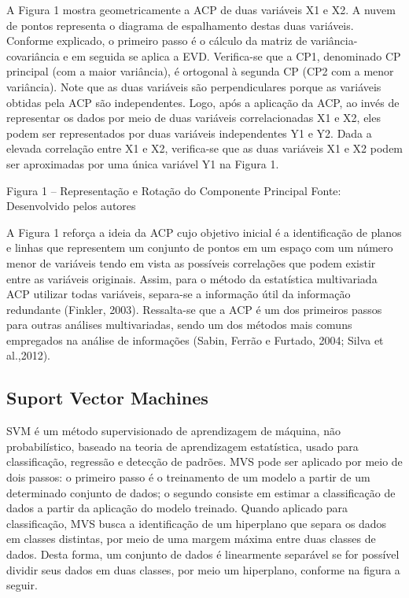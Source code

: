 A Figura 1 mostra geometricamente a ACP de duas variáveis X1 e X2. A nuvem de pontos representa o diagrama de espalhamento destas duas variáveis. Conforme explicado, o primeiro passo é o cálculo da matriz de variância-covariância e em seguida se aplica a EVD. Verifica-se que a CP1, denominado CP principal (com a maior variância), é ortogonal à segunda CP (CP2 com a menor variância). Note que as duas variáveis são perpendiculares porque as variáveis obtidas pela ACP são independentes. Logo, após a aplicação da ACP, ao invés de representar os dados por meio de duas variáveis correlacionadas X1 e X2, eles podem ser representados por duas variáveis independentes Y1 e Y2. Dada a elevada correlação entre X1 e X2, verifica-se que as duas variáveis X1 e X2 podem ser aproximadas por uma única variável Y1 na Figura 1.

Figura 1 – Representação e Rotação do Componente Principal
Fonte: Desenvolvido pelos autores

A Figura 1 reforça a ideia da ACP cujo objetivo inicial é a identificação de planos e linhas que representem um conjunto de pontos em um espaço com um número menor de variáveis tendo em vista as possíveis correlações que podem existir entre as variáveis originais.
Assim, para o método da estatística multivariada ACP utilizar todas variáveis, separa-se a informação útil da informação redundante (Finkler, 2003). Ressalta-se que a ACP é um dos primeiros passos para outras análises multivariadas, sendo um dos métodos mais comuns empregados na análise de informações (Sabin, Ferrão e Furtado, 2004; Silva et al.,2012).

\subsection{Suport Vector Machines}

SVM é um método supervisionado de aprendizagem de máquina, não probabilístico, baseado na teoria de aprendizagem estatística, usado para classificação, regressão e detecção de padrões. MVS pode ser aplicado por meio de dois passos: o primeiro passo é o treinamento de um modelo a partir de um determinado conjunto de dados; o segundo consiste em estimar a classificação de dados a partir da aplicação do modelo treinado. 
Quando aplicado para classificação, MVS busca a identificação de um hiperplano que separa os dados em classes distintas, por meio de uma margem máxima entre duas classes de dados. Desta forma, um conjunto de dados é linearmente separável se for possível dividir seus dados em duas classes, por meio um hiperplano, conforme na figura a seguir. 

